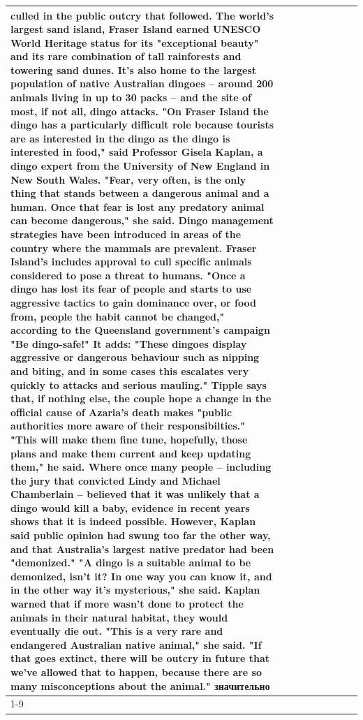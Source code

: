 \begin{table}[H]
\begin{tabular}{lllrlllll}
culled in the public outcry that followed. The world's largest sand island, Fraser Island earned UNESCO World Heritage status for its "exceptional beauty" and its rare combination of tall rainforests and towering sand dunes. It's also home to the largest population of native Australian dingoes -- around 200 animals living in up to 30 packs -- and the site of most, if not all, dingo attacks. "On Fraser Island the dingo has a particularly difficult role because tourists are as interested in the dingo as the dingo is interested in food," said Professor Gisela Kaplan, a dingo expert from the University of New England in New South Wales. "Fear, very often, is the only thing that stands between a dangerous animal and a human. Once that fear is lost any predatory animal can become dangerous," she said. Dingo management strategies have been introduced in areas of the country where the mammals are prevalent. Fraser Island's includes approval to cull specific animals considered to pose a threat to humans. "Once a dingo has lost its fear of people and starts to use aggressive tactics to gain dominance over, or food from, people the habit cannot be changed," according to the Queensland government's campaign "Be dingo-safe!" It adds: "These dingoes display aggressive or dangerous behaviour such as nipping and biting, and in some cases this escalates very quickly to attacks and serious mauling." Tipple says that, if nothing else, the couple hope a change in the official cause of Azaria's death makes "public authorities more aware of their responsibilties." "This will make them fine tune, hopefully, those plans and make them current and keep updating them," he said. Where once many people -- including the jury that convicted Lindy and Michael Chamberlain -- believed that it was unlikely that a dingo would kill a baby, evidence in recent years shows that it is indeed possible. However, Kaplan said public opinion had swung too far the other way, and that Australia's largest native predator had been "demonized." "A dingo is a suitable animal to be demonized, isn't it? In one way you can know it, and in the other way it's mysterious," she said. Kaplan warned that if more wasn't done to protect the animals in their natural habitat, they would eventually die out. "This is a very rare and endangered Australian native animal," she said. "If that goes extinct, there will be outcry in future that we've allowed that to happen, because there are so many misconceptions about the animal." значительно \\
\cline{1-9}

\end{tabular}
\end{table}
